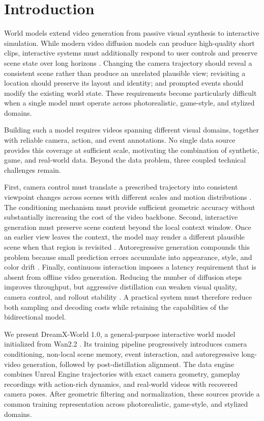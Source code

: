 \documentclass{llmxive}
\providecommand{\method}{DreamX-World 1.0}
\begin{document}
\section{Introduction}

World models extend video generation from passive visual synthesis to
interactive simulation. While modern video diffusion models can produce
high-quality short clips, interactive systems must additionally respond to
user controls and preserve scene state over long horizons
\citep{wan2025wan, gao2026lingbotworld, hyworld2025}.
Changing the camera trajectory should reveal a consistent scene rather than
produce an unrelated plausible view; revisiting a location should preserve its
layout and identity; and prompted events should modify the existing world
state. These requirements become particularly difficult when a single model
must operate across photorealistic, game-style, and stylized domains.

Building such a model requires videos spanning different visual domains,
together with reliable camera, action, and event annotations. No single data
source provides this coverage at sufficient scale, motivating the combination
of synthetic, game, and real-world data. Beyond the data problem, three coupled
technical challenges remain.

First, camera control must translate a prescribed trajectory into consistent
viewpoint changes across scenes with different scales and motion distributions
\citep{bahmani2025ac3d}. The conditioning mechanism must provide sufficient
geometric accuracy without substantially increasing the cost of the video
backbone.
% 
Second, interactive generation must preserve scene content beyond the local
context window. Once an earlier view leaves the context, the model may render a
different plausible scene when that region is revisited
\citep{hong2025relic}. Autoregressive generation compounds this problem because
small prediction errors accumulate into appearance, style, and color drift
\citep{huang2025selfforcing}.
% 
Finally, continuous interaction imposes a latency requirement that is absent
from offline video generation. Reducing the number of diffusion steps improves
throughput, but aggressive distillation can weaken visual quality, camera
control, and rollout stability \citep{zhu2026causalforcing}. A practical system
must therefore reduce both sampling and decoding costs while retaining the
capabilities of the bidirectional model.

We present \method{}, a general-purpose interactive world model initialized
from Wan2.2 \citep{wan2025wan}. Its training pipeline progressively
introduces camera conditioning, non-local scene memory, event interaction, and
autoregressive long-video generation, followed by post-distillation alignment.
% 
The data engine combines Unreal Engine trajectories with exact camera geometry,
gameplay recordings with action-rich dynamics, and real-world videos with
recovered camera poses. After geometric filtering and normalization, these
sources provide a common training representation across photorealistic,
game-style, and stylized domains.
\end{document}
